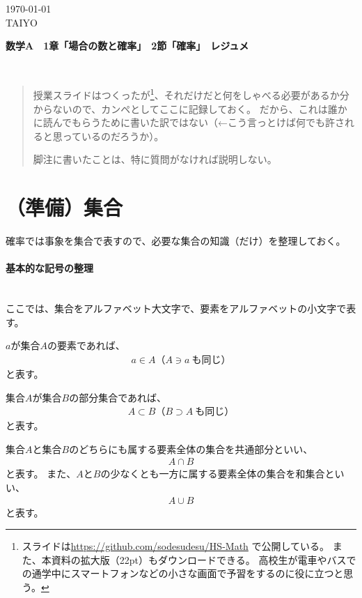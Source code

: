 \documentclass[luatexja,fontsize=12pt]{jlreq}\usepackage{ifthen}\newcounter{enlarge}\setcounter{enlarge}{1}
\newcommand{\LS}[2]{\ifthenelse{\value{enlarge}=2 \OR \value{enlarge}=3}{#1}{#2}}
\newcommand{\LO}[1]{\LS{#1}{\relax}}
\begin{document}
\begin{flushright}
\today \\
TAIYO
\end{flushright}

{\Large%
\noindent
\textbf{%
数学A　1章「場合の数と確率」　2節「確率」　レジュメ
\LO{\\ \color{teal} 〈拡大版〉}}
}

{\footnotesize%
\mbox{}\\

}
\begin{quotation}
授業スライドはつくったが\footnote{%
スライドは\url{https://github.com/sodesudesu/HS-Math}
で公開している。
また、本資料の拡大版（22pt）もダウンロードできる。
高校生が電車やバスでの通学中にスマートフォンなどの小さな画面で予習をするのに役に立つと思う。}、それだけだと何をしゃべる必要があるか分からないので、カンペとしてここに記録しておく。
だから、これは誰かに読んでもらうために書いた訳ではない（←こう言っとけば何でも許されると思っているのだろうか）。

脚注に書いたことは、特に質問がなければ説明しない。
\end{quotation}

\section*{（準備）集合}

確率では事象を集合で表すので、必要な集合の知識（だけ）を整理しておく。
\mbox{}\\

\paragraph{基本的な記号の整理}\mbox{}\\
\indent
ここでは、集合をアルファベット大文字で、要素をアルファベットの小文字で表す。

$a$が集合$A$の要素であれば、
\begin{align} \label{eq:0_1}
a \in A　（A \ni a~も同じ）
\end{align}
と表す。

集合$A$が集合$B$の部分集合であれば、
\begin{align} \label{eq:0_2}
A \subset B　（B \supset A~も同じ）
\end{align}
と表す。

集合$A$と集合$B$のどちらにも属する要素全体の集合を共通部分といい、
\begin{align} \label{eq:0_3}
A \cap B
\end{align}
と表す。
また、$A$と$B$の少なくとも一方に属する要素全体の集合を和集合といい、
\begin{align} \label{eq:0_4}
A \cup B
\end{align}
と表す。
\end{document}
